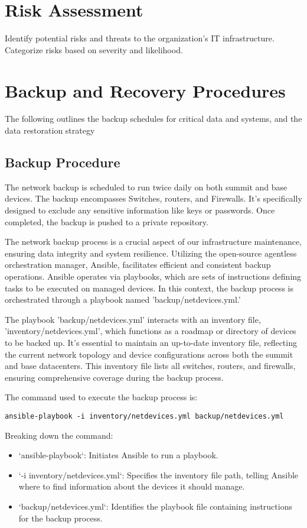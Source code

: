 \section{Risk Assessment}

Identify potential risks and threats to the organization's IT infrastructure.
Categorize risks based on severity and likelihood.

\section{Backup and Recovery Procedures}
The following outlines the backup schedules for critical data and systems, and the data restoration strategy

\subsection{Backup Procedure}
The network backup is scheduled to run twice daily on both summit and base devices. The backup encompasses Switches, routers, and Firewalls. It's specifically designed to exclude any sensitive information like keys or passwords. Once completed, the backup is pushed to a private repository.

The network backup process is a crucial aspect of our infrastructure maintenance, ensuring data integrity and system resilience. Utilizing the open-source agentless orchestration manager, Ansible, facilitates efficient and consistent backup operations. Ansible operates via playbooks, which are sets of instructions defining tasks to be executed on managed devices. In this context, the backup process is orchestrated through a playbook named 'backup/netdevices.yml.'

The playbook 'backup/netdevices.yml' interacts with an inventory file, 'inventory/netdevices.yml', which functions as a roadmap or directory of devices to be backed up. It's essential to maintain an up-to-date inventory file, reflecting the current network topology and device configurations across both the summit and base datacenters. This inventory file lists all switches, routers, and firewalls, ensuring comprehensive coverage during the backup process.

The command used to execute the backup process is:

\begin{verbatim}
ansible-playbook -i inventory/netdevices.yml backup/netdevices.yml
\end{verbatim}

Breaking down the command:
\begin{itemize}
    \item `ansible-playbook`: Initiates Ansible to run a playbook.
    \item `-i inventory/netdevices.yml`: Specifies the inventory file path, telling Ansible where to find information about the devices it should manage.
    \item `backup/netdevices.yml`: Identifies the playbook file containing instructions for the backup process.
\end{itemize}

